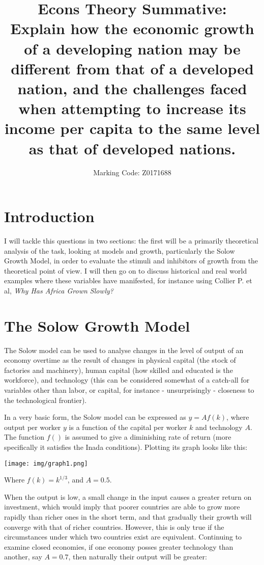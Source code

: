 \documentclass[12pt]{article}
\author{Marking Code: Z0171688}
\title{Econs Theory Summative:\\ 
Explain how the economic growth of a developing nation may be different from that of a developed nation, and the challenges faced when attempting to increase its income per capita to the same level as that of developed nations.
}
\begin{document}
\maketitle
\pagebreak

\section{Introduction}
I will tackle this questions in two sections: the first will be a primarily theoretical 
analysis of the task, looking at models and growth, particularly the Solow Growth Model, 
in order to evaluate the stimuli and inhibitors of growth from the theoretical point 
of view. I will then go on to discuss historical and real world examples where these 
variables have manifested, for instance using Collier P. et al, 
\textit{Why Has Africa Grown Slowly?}

\section{The Solow Growth Model}
The Solow model can be used to analyse changes in the level of output of an economy 
overtime as the result of changes in physical capital (the stock of factories and 
machinery), human capital (how skilled and educated is the workforce), and technology 
(this can be considered somewhat of a catch-all for variables other than labor, or 
capital, for instance - unsurprisingly - closeness to the technological frontier). 
\newline

In a very basic form, the Solow model can be expressed as \( y = Af(k) \), 
where output per worker $y$ is a function of the capital per worker $k$ and technology 
$A$. The function $f()$ is assumed to give a diminishing rate of return (more specifically
it satisfies the Inada conditions). Plotting its graph looks like this:

\texttt{[image: img/graph1.png]}

Where \(f(k) = k^{1/3} \), and \( A = 0.5 \). 
\newline

When the output is low, a small change in the input causes a greater return on investment,
which would imply that poorer countries are able to grow more rapidly than richer ones in 
the short term, and that gradually their growth will converge with that of richer 
countries. However, this is only true if the circumstances under which two countries exist 
are equivalent. Continuing to examine closed economies, if one economy posses greater 
technology than another, say \( A = 0.7 \),  then naturally their 
output will be greater:
\end{document}
